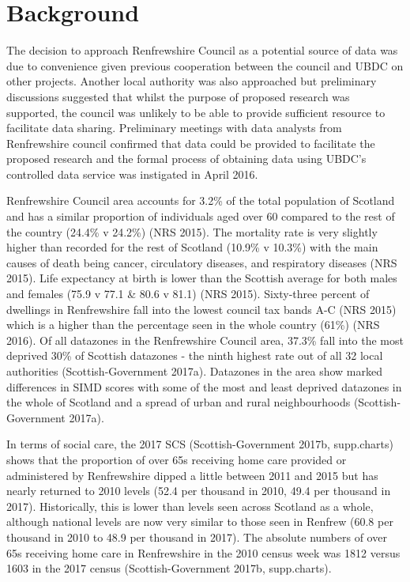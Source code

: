 \documentclass[]{article}
\begin{document}
\section{Background}\label{sec:renf-background}

The decision to approach Renfrewshire Council as a potential source of
data was due to convenience given previous cooperation between the
council and UBDC on other projects. Another local authority was also
approached but preliminary discussions suggested that whilst the purpose
of proposed research was supported, the council was unlikely to be able
to provide sufficient resource to facilitate data sharing. Preliminary
meetings with data analysts from Renfrewshire council confirmed that
data could be provided to facilitate the proposed research and the
formal process of obtaining data using UBDC's controlled data service
was instigated in April 2016.

Renfrewshire Council area accounts for 3.2\% of the total population of
Scotland and has a similar proportion of individuals aged over 60
compared to the rest of the country (24.4\% v 24.2\%) (NRS 2015). The
mortality rate is very slightly higher than recorded for the rest of
Scotland (10.9\% v 10.3\%) with the main causes of death being cancer,
circulatory diseases, and respiratory diseases (NRS 2015). Life
expectancy at birth is lower than the Scottish average for both males
and females (75.9 v 77.1 \& 80.6 v 81.1) (NRS 2015). Sixty-three percent
of dwellings in Renfrewshire fall into the lowest council tax bands A-C
(NRS 2015) which is a higher than the percentage seen in the whole
country (61\%) (NRS 2016). Of all datazones in the Renfrewshire Council
area, 37.3\% fall into the most deprived 30\% of Scottish datazones -
the ninth highest rate out of all 32 local authorities
(Scottish-Government 2017a). Datazones in the area show marked
differences in SIMD scores with some of the most and least deprived
datazones in the whole of Scotland and a spread of urban and rural
neighbourhoods (Scottish-Government 2017a).

In terms of social care, the 2017 SCS (Scottish-Government 2017b,
supp.charts) shows that the proportion of over 65s receiving home care
provided or administered by Renfrewshire dipped a little between 2011
and 2015 but has nearly returned to 2010 levels (52.4 per thousand in
2010, 49.4 per thousand in 2017). Historically, this is lower than
levels seen across Scotland as a whole, although national levels are now
very similar to those seen in Renfrew (60.8 per thousand in 2010 to 48.9
per thousand in 2017). The absolute numbers of over 65s receiving home
care in Renfrewshire in the 2010 census week was 1812 versus 1603 in the
2017 census (Scottish-Government 2017b, supp.charts).
\end{document}
